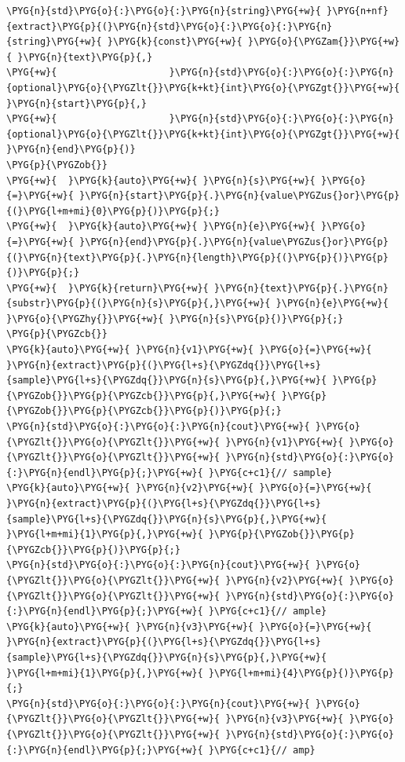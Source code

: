 \begin{itemize}
\begin{codeblockbg}
\begin{Verbatim}[commandchars=\\\{\},breaklines=true,breakanywhere=true,fontsize=\codefont,xleftmargin=17bp]
\PYG{n}{std}\PYG{o}{:}\PYG{o}{:}\PYG{n}{string}\PYG{+w}{ }\PYG{n+nf}{extract}\PYG{p}{(}\PYG{n}{std}\PYG{o}{:}\PYG{o}{:}\PYG{n}{string}\PYG{+w}{ }\PYG{k}{const}\PYG{+w}{ }\PYG{o}{\PYGZam{}}\PYG{+w}{ }\PYG{n}{text}\PYG{p}{,}
\PYG{+w}{                    }\PYG{n}{std}\PYG{o}{:}\PYG{o}{:}\PYG{n}{optional}\PYG{o}{\PYGZlt{}}\PYG{k+kt}{int}\PYG{o}{\PYGZgt{}}\PYG{+w}{ }\PYG{n}{start}\PYG{p}{,}
\PYG{+w}{                    }\PYG{n}{std}\PYG{o}{:}\PYG{o}{:}\PYG{n}{optional}\PYG{o}{\PYGZlt{}}\PYG{k+kt}{int}\PYG{o}{\PYGZgt{}}\PYG{+w}{ }\PYG{n}{end}\PYG{p}{)}
\PYG{p}{\PYGZob{}}
\PYG{+w}{  }\PYG{k}{auto}\PYG{+w}{ }\PYG{n}{s}\PYG{+w}{ }\PYG{o}{=}\PYG{+w}{ }\PYG{n}{start}\PYG{p}{.}\PYG{n}{value\PYGZus{}or}\PYG{p}{(}\PYG{l+m+mi}{0}\PYG{p}{)}\PYG{p}{;}
\PYG{+w}{  }\PYG{k}{auto}\PYG{+w}{ }\PYG{n}{e}\PYG{+w}{ }\PYG{o}{=}\PYG{+w}{ }\PYG{n}{end}\PYG{p}{.}\PYG{n}{value\PYGZus{}or}\PYG{p}{(}\PYG{n}{text}\PYG{p}{.}\PYG{n}{length}\PYG{p}{(}\PYG{p}{)}\PYG{p}{)}\PYG{p}{;}
\PYG{+w}{  }\PYG{k}{return}\PYG{+w}{ }\PYG{n}{text}\PYG{p}{.}\PYG{n}{substr}\PYG{p}{(}\PYG{n}{s}\PYG{p}{,}\PYG{+w}{ }\PYG{n}{e}\PYG{+w}{ }\PYG{o}{\PYGZhy{}}\PYG{+w}{ }\PYG{n}{s}\PYG{p}{)}\PYG{p}{;}
\PYG{p}{\PYGZcb{}}
\PYG{k}{auto}\PYG{+w}{ }\PYG{n}{v1}\PYG{+w}{ }\PYG{o}{=}\PYG{+w}{ }\PYG{n}{extract}\PYG{p}{(}\PYG{l+s}{\PYGZdq{}}\PYG{l+s}{sample}\PYG{l+s}{\PYGZdq{}}\PYG{n}{s}\PYG{p}{,}\PYG{+w}{ }\PYG{p}{\PYGZob{}}\PYG{p}{\PYGZcb{}}\PYG{p}{,}\PYG{+w}{ }\PYG{p}{\PYGZob{}}\PYG{p}{\PYGZcb{}}\PYG{p}{)}\PYG{p}{;}
\PYG{n}{std}\PYG{o}{:}\PYG{o}{:}\PYG{n}{cout}\PYG{+w}{ }\PYG{o}{\PYGZlt{}}\PYG{o}{\PYGZlt{}}\PYG{+w}{ }\PYG{n}{v1}\PYG{+w}{ }\PYG{o}{\PYGZlt{}}\PYG{o}{\PYGZlt{}}\PYG{+w}{ }\PYG{n}{std}\PYG{o}{:}\PYG{o}{:}\PYG{n}{endl}\PYG{p}{;}\PYG{+w}{ }\PYG{c+c1}{// sample}
\PYG{k}{auto}\PYG{+w}{ }\PYG{n}{v2}\PYG{+w}{ }\PYG{o}{=}\PYG{+w}{ }\PYG{n}{extract}\PYG{p}{(}\PYG{l+s}{\PYGZdq{}}\PYG{l+s}{sample}\PYG{l+s}{\PYGZdq{}}\PYG{n}{s}\PYG{p}{,}\PYG{+w}{ }\PYG{l+m+mi}{1}\PYG{p}{,}\PYG{+w}{ }\PYG{p}{\PYGZob{}}\PYG{p}{\PYGZcb{}}\PYG{p}{)}\PYG{p}{;}
\PYG{n}{std}\PYG{o}{:}\PYG{o}{:}\PYG{n}{cout}\PYG{+w}{ }\PYG{o}{\PYGZlt{}}\PYG{o}{\PYGZlt{}}\PYG{+w}{ }\PYG{n}{v2}\PYG{+w}{ }\PYG{o}{\PYGZlt{}}\PYG{o}{\PYGZlt{}}\PYG{+w}{ }\PYG{n}{std}\PYG{o}{:}\PYG{o}{:}\PYG{n}{endl}\PYG{p}{;}\PYG{+w}{ }\PYG{c+c1}{// ample}
\PYG{k}{auto}\PYG{+w}{ }\PYG{n}{v3}\PYG{+w}{ }\PYG{o}{=}\PYG{+w}{ }\PYG{n}{extract}\PYG{p}{(}\PYG{l+s}{\PYGZdq{}}\PYG{l+s}{sample}\PYG{l+s}{\PYGZdq{}}\PYG{n}{s}\PYG{p}{,}\PYG{+w}{ }\PYG{l+m+mi}{1}\PYG{p}{,}\PYG{+w}{ }\PYG{l+m+mi}{4}\PYG{p}{)}\PYG{p}{;}
\PYG{n}{std}\PYG{o}{:}\PYG{o}{:}\PYG{n}{cout}\PYG{+w}{ }\PYG{o}{\PYGZlt{}}\PYG{o}{\PYGZlt{}}\PYG{+w}{ }\PYG{n}{v3}\PYG{+w}{ }\PYG{o}{\PYGZlt{}}\PYG{o}{\PYGZlt{}}\PYG{+w}{ }\PYG{n}{std}\PYG{o}{:}\PYG{o}{:}\PYG{n}{endl}\PYG{p}{;}\PYG{+w}{ }\PYG{c+c1}{// amp}
\end{Verbatim}
\end{codeblockbg}



\end{itemize}
